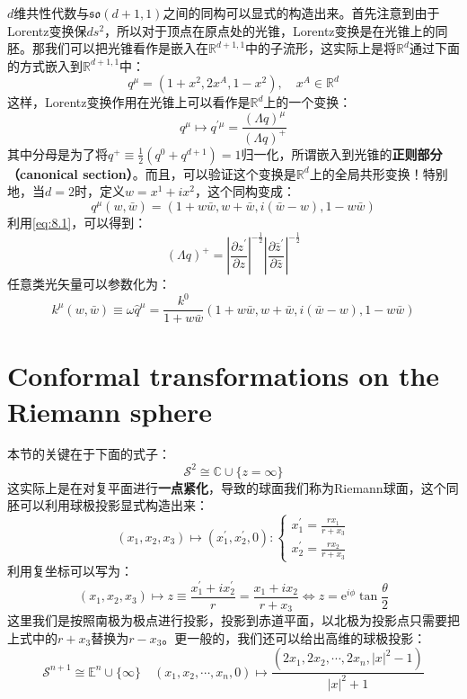 	$d$维共性代数与$\mathfrak{so}(d+1,1)$之间的同构可以显式的构造出来\cite{Rychkov:2016iqz,Hugh}。首先注意到由于Lorentz变换保$ds^2$，所以对于顶点在原点处的光锥，Lorentz变换是在光锥上的同胚。那我们可以把光锥看作是嵌入在$\mathbb{R}^{d+1,1}$中的子流形，这实际上是将$\mathbb{R}^{d}$通过下面的方式嵌入到$\mathbb{R}^{d+1,1}$中：
	\begin{equation}
		q^{\mu}=(1+x^2,2x^A,1-x^2),\quad x^A\in\mathbb{R}^d
	\end{equation}
	这样，Lorentz变换作用在光锥上可以看作是$\mathbb{R}^d$上的一个变换：
	\begin{equation}
		q^\mu\mapsto q^{\prime\mu}=\frac{(\Lambda q)^\mu}{(\Lambda q)^+}
	\end{equation}
	其中分母是为了将$q^+\equiv\frac{1}{2}\left(q^0+q^{d+1}\right)=1$归一化，所谓嵌入到光锥的\textbf{正则部分（canonical section）}。而且，可以验证这个变换是$\mathbb{R}^d$上的全局共形变换！特别地，当$d=2$时，定义$w=x^1+ix^2$，这个同构变成：
	\begin{equation}
		q^\mu(w,\bar w)=(1+w\bar w,w+\bar w,i(\bar w-w),1-w\bar w)
	\end{equation}
	利用\ref{eq:8.1}，可以得到：
	$$(\Lambda q)^+=\left|\frac{\partial z^\prime}{\partial z}\right|^{-\frac{1}{2}}\left|\frac{\partial \bar z^\prime}{\partial \bar z}\right|^{-\frac{1}{2}}$$
	任意类光矢量可以参数化为：
	\begin{equation}
		k^\mu(w,\bar w)\equiv\omega {\hat q}^\mu=\frac{k^0}{1+w\bar w}(1+w\bar w,w+\bar w,i(\bar w-w),1-w\bar w)
	\end{equation}
\section{Conformal transformations on the Riemann sphere}
本节的关键在于下面的式子：
\begin{equation}
	\mathcal{S}^2\cong\mathbb{C}\cup\{z=\infty\}
\end{equation}
这实际上是在对复平面进行\textbf{一点紧化}，导致的球面我们称为Riemann球面，这个同胚可以利用球极投影显式构造出来：
\begin{equation}
	(x_1,x_2,x_3)\mapsto(x_1^{\prime},x_2^{\prime},0):\begin{cases}
		x_1^{\prime}=\frac{rx_1}{r+x_3}\\
		x_2^{\prime}=\frac{rx_2}{r+x_3}
	\end{cases}
\end{equation}
利用复坐标可以写为：
\begin{equation}
	(x_1,x_2,x_3)\mapsto z\equiv\frac{x_1^{\prime}+ix_2^{\prime}}{r}=\frac{x_1+ix_2}{r+x_3}\iff z=\mathrm{e}^{i\phi}\tan\frac{\theta}{2}
\end{equation}
这里我们是按照南极为极点进行投影，投影到赤道平面，以北极为投影点只需要把上式中的$r+x_3$替换为$r-x_3$。更一般的，我们还可以给出高维的球极投影：
\begin{equation}
	\mathcal{S}^{n+1}\cong{\mathbb{E}^{n}\cup\{\infty\}}
	\quad(x_1, x_2, \cdots, x_n,0) \mapsto\frac{(2x_1, 2x_2, \cdots, 2x_n, |x|^2 - 1)}{|x|^2 + 1}
\end{equation}

